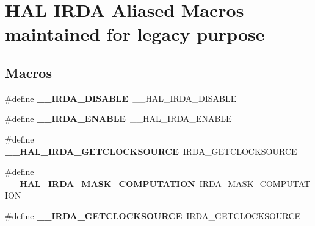 \hypertarget{group___h_a_l___i_r_d_a___aliased___macros}{}\section{H\+AL I\+R\+DA Aliased Macros maintained for legacy purpose}
\label{group___h_a_l___i_r_d_a___aliased___macros}
\subsection*{Macros}
\begin{DoxyCompactItemize}
\item 
\mbox{\label{group___h_a_l___i_r_d_a___aliased___macros_gae107b46fa75a7f1f5eb0734cbb24e997}} 
\#define {\bfseries \+\_\+\+\_\+\+I\+R\+D\+A\+\_\+\+D\+I\+S\+A\+B\+LE}~\+\_\+\+\_\+\+H\+A\+L\+\_\+\+I\+R\+D\+A\+\_\+\+D\+I\+S\+A\+B\+LE
\item 
\mbox{\label{group___h_a_l___i_r_d_a___aliased___macros_ga30e950fea9b8b878eb721ef488572f93}} 
\#define {\bfseries \+\_\+\+\_\+\+I\+R\+D\+A\+\_\+\+E\+N\+A\+B\+LE}~\+\_\+\+\_\+\+H\+A\+L\+\_\+\+I\+R\+D\+A\+\_\+\+E\+N\+A\+B\+LE
\item 
\mbox{\label{group___h_a_l___i_r_d_a___aliased___macros_ga914579d3d8a0ebefab093a54a60bdef4}} 
\#define {\bfseries \+\_\+\+\_\+\+H\+A\+L\+\_\+\+I\+R\+D\+A\+\_\+\+G\+E\+T\+C\+L\+O\+C\+K\+S\+O\+U\+R\+CE}~I\+R\+D\+A\+\_\+\+G\+E\+T\+C\+L\+O\+C\+K\+S\+O\+U\+R\+CE
\item 
\mbox{\label{group___h_a_l___i_r_d_a___aliased___macros_ga5dfede2931b25ae470e8b9222cd7f276}} 
\#define {\bfseries \+\_\+\+\_\+\+H\+A\+L\+\_\+\+I\+R\+D\+A\+\_\+\+M\+A\+S\+K\+\_\+\+C\+O\+M\+P\+U\+T\+A\+T\+I\+ON}~I\+R\+D\+A\+\_\+\+M\+A\+S\+K\+\_\+\+C\+O\+M\+P\+U\+T\+A\+T\+I\+ON
\item 
\mbox{\label{group___h_a_l___i_r_d_a___aliased___macros_ga91d8bac965400b5b1e0a9be356a9e477}} 
\#define {\bfseries \+\_\+\+\_\+\+I\+R\+D\+A\+\_\+\+G\+E\+T\+C\+L\+O\+C\+K\+S\+O\+U\+R\+CE}~I\+R\+D\+A\+\_\+\+G\+E\+T\+C\+L\+O\+C\+K\+S\+O\+U\+R\+CE

\end{DoxyCompactItemize}
